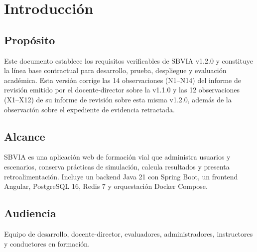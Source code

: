 \documentclass[11pt,a4paper]{article}
\begin{document}
\newpage

\section{Introducción}

\subsection{Propósito}
Este documento establece los requisitos verificables de SBVIA v1.2.0 y constituye la línea base contractual para desarrollo, prueba, despliegue y evaluación académica. Esta versión corrige las 14 observaciones (N1–N14) del informe de revisión emitido por el docente-director sobre la v1.1.0 y las 12 observaciones (X1–X12) de su informe de revisión sobre esta misma v1.2.0, además de la observación sobre el expediente de evidencia retractada.

\subsection{Alcance}
SBVIA es una aplicación web de formación vial que administra usuarios y escenarios, conserva prácticas de simulación, calcula resultados y presenta retroalimentación. Incluye un backend Java 21 con Spring Boot, un frontend Angular, PostgreSQL 16, Redis 7 y orquestación Docker Compose.

\subsection{Audiencia}
Equipo de desarrollo, docente-director, evaluadores, administradores, instructores y conductores en formación.
\end{document}
